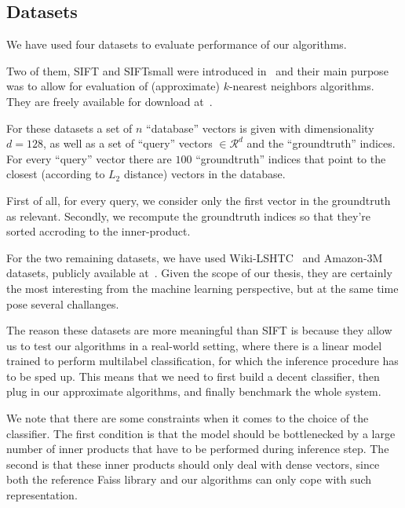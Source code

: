     \subsection{Datasets}\label{subsec:datasets}

        We have used four datasets to evaluate performance of our algorithms.

        Two of them, SIFT and SIFTsmall were introduced in~\cite{jegou2011product} and their
        main purpose was to allow for evaluation of (approximate) $k$-nearest neighbors algorithms. They are freely
        available for download at~\cite{sift}.

        For these datasets a set of $n$ ``database'' vectors is given with dimensionality
        $d=128$, as well as a set of ``query'' vectors $\in \mathcal{R}^d$
        and the ``groundtruth'' indices. For every ``query'' vector there are $100$ ``groundtruth'' indices
        that point to the closest (according to $L_2$ distance) vectors in the database.

        First of all, for every query, we consider only the first vector in the groundtruth as relevant.
        Secondly, we recompute the groundtruth indices so that they're sorted accroding to the inner-product.

        For the two remaining datasets, we have used Wiki-LSHTC~\cite{lshtc} and
        Amazon-3M~\cite{a3m} datasets, publicly available at~\cite{exrepo}.
        Given the scope of our thesis, they are certainly the most interesting from the machine learning perspective,
        but at the same time pose several challanges.

        The reason these datasets are more meaningful than SIFT is because they allow us to test our
        algorithms in a real-world setting, where there is a linear model trained to perform multilabel
        classification, for which the inference procedure has to be sped up.
        This means that we need to first build a decent classifier, then plug in our approximate algorithms,
        and finally benchmark the whole system.

        We note that there are some constraints when it comes to the choice of the classifier. The first condition
        is that the model should be bottlenecked by a large number of inner products that have to be performed during
        inference step. The second is that these inner products should only deal with dense vectors,
        since both the reference Faiss library and our algorithms can only cope with such representation.

